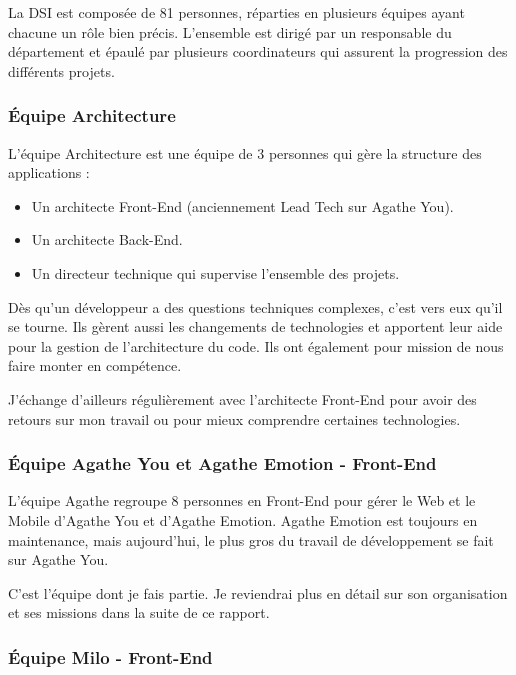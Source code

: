 \documentclass{article}
\begin{document}
La DSI est composée de 81 personnes, réparties en plusieurs équipes ayant chacune un rôle bien précis. L'ensemble est dirigé par un responsable du département et épaulé par plusieurs coordinateurs qui assurent la progression des différents projets.

\newpage

\subsubsection{Équipe Architecture}

L'équipe Architecture est une équipe de 3 personnes qui gère la structure des applications :

\begin{itemize}
    \item Un architecte Front-End (anciennement Lead Tech sur Agathe You).
    \item Un architecte Back-End.
    \item Un directeur technique qui supervise l'ensemble des projets.
\end{itemize}

Dès qu'un développeur a des questions techniques complexes, c'est vers eux qu'il se tourne. Ils gèrent aussi les changements de technologies et apportent leur aide pour la gestion de l'architecture du code. Ils ont également pour mission de nous faire monter en compétence.

J'échange d'ailleurs régulièrement avec l'architecte Front-End pour avoir des retours sur mon travail ou pour mieux comprendre certaines technologies.

\subsubsection{Équipe Agathe You et Agathe Emotion - Front-End}

L'équipe Agathe regroupe 8 personnes en Front-End pour gérer le Web et le Mobile d'Agathe You et d'Agathe Emotion. Agathe Emotion est toujours en maintenance, mais aujourd'hui, le plus gros du travail de développement se fait sur Agathe You.

C'est l'équipe dont je fais partie. Je reviendrai plus en détail sur son organisation et ses missions dans la suite de ce rapport.

\subsubsection{Équipe Milo - Front-End}
\end{document}
